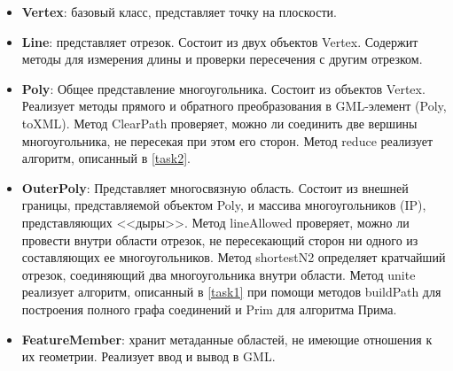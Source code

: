 \begin{center}
\end{center}

\begin{itemize}
\item \textbf{Vertex}: базовый класс, представляет точку на плоскости.
\item \textbf{Line}: представляет отрезок. Состоит из двух объектов Vertex. Содержит методы для измерения длины и проверки пересечения с другим отрезком.
\item \textbf{Poly}: Общее представление многоугольника. Состоит из объектов Vertex. Реализует методы прямого и обратного преобразования в GML-элемент (Poly, toXML). Метод ClearPath проверяет, можно ли соединить две вершины многоугольника, не пересекая при этом его сторон. Метод reduce реализует алгоритм, описанный в \ref{task2}.
\item \textbf{OuterPoly}: Представляет многосвязную область. Состоит из внешней границы, представляемой объектом Poly, и массива многоугольников (IP), представляющих <<дыры>>. Метод lineAllowed проверяет, можно ли провести внутри области отрезок, не пересекающий сторон ни одного из составляющих ее многоугольников. Метод shortestN2 определяет кратчайший отрезок, соединяющий два многоугольника внутри области. Метод unite реализует алгоритм, описанный в \ref{task1} при помощи методов buildPath для построения полного графа соединений и Prim для алгоритма Прима.
\item \textbf{FeatureMember}: хранит метаданные областей, не имеющие отношения к их геометрии. Реализует ввод и вывод в GML.
\end{itemize}

